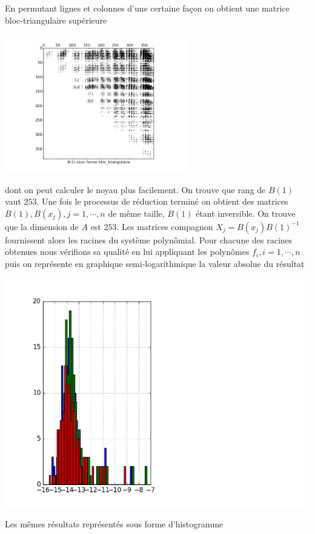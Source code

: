 \documentclass{standalone}
\begin{document}
  En permutant lignes et colonnes d'une certaine façon on obtient une matrice bloc-triangulaire supérieure
   \begin{center}
  \includegraphics[width=8cm]{../png/beztri.png}
  \end{center}
  dont on peut calculer le noyau plus facilement. On trouve que rang de $B(1)$ vaut $253$.
  Une fois le processus de réduction terminé on obtient des matrices $B(1), B(x_j), j=1,\cdots,n$ de même taille, $B(1)$ étant inversible. On trouve que la dimension de $A$ est $253$. Les matrices compagnon $X_j = B(x_j)B(1)^{-1}$ fournissent alors les racines du système polynômial. Pour chacune des racines obtenues nous vérifions sa qualité en lui appliquant les polynômes $f_i, i=1,\cdots,n$ puis on représente en graphique semi-logarithmique la  valeur absolue du résultat
   \begin{center}
  \includegraphics[height=10cm, width=18cm]{../png/ref.png}
  \end{center}
  Les mêmes résultats représentés sous forme d'histogramme
\end{document}
